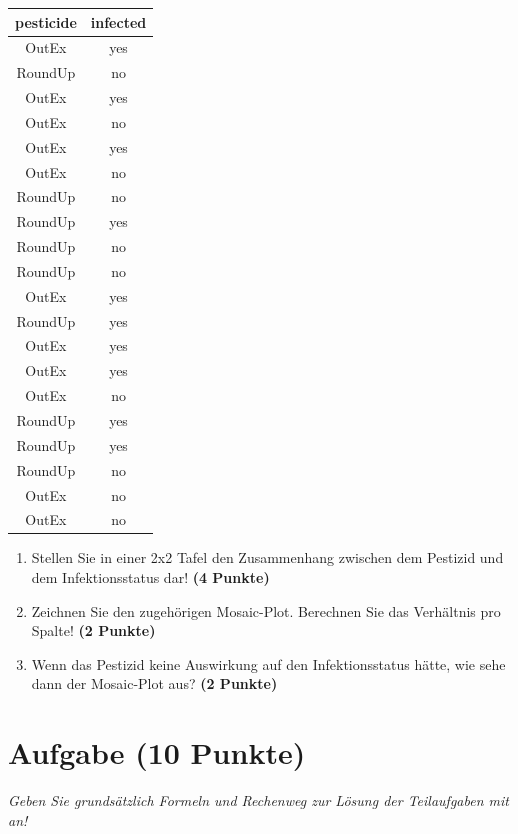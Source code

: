 \documentclass[a4paper, 10pt]{scrartcl}\usepackage[]{graphicx}\usepackage[]{xcolor}
\begin{document}
\begin{table}[!h]
\centering
\begin{tabular}{cc}
\toprule
pesticide & infected\\
\midrule
OutEx & yes\\
RoundUp & no\\
OutEx & yes\\
OutEx & no\\
OutEx & yes\\
\addlinespace
OutEx & no\\
RoundUp & no\\
RoundUp & yes\\
RoundUp & no\\
RoundUp & no\\
\addlinespace
OutEx & yes\\
RoundUp & yes\\
OutEx & yes\\
OutEx & yes\\
OutEx & no\\
\addlinespace
RoundUp & yes\\
RoundUp & yes\\
RoundUp & no\\
OutEx & no\\
OutEx & no\\
\bottomrule
\end{tabular}
\end{table}



\begin{enumerate}
\item Stellen Sie in einer 2x2 Tafel den Zusammenhang zwischen dem
  Pestizid und dem Infektionsstatus dar! \textbf{(4 Punkte)}
\item Zeichnen Sie den zugeh{\"o}rigen Mosaic-Plot. Berechnen Sie das
  Verh{\"a}ltnis pro Spalte! \textbf{(2 Punkte)}
\item Wenn das Pestizid keine Auswirkung auf den Infektionsstatus h{\"a}tte, wie
  sehe dann der Mosaic-Plot aus? \textbf{(2 Punkte)}
\end{enumerate} 
\clearpage

\section{Aufgabe \hfill (10 Punkte)}

\textit{Geben Sie grunds{\"a}tzlich Formeln und Rechenweg zur L{\"o}sung der
  Teilaufgaben mit an!} \\[1Ex]
\end{document}
